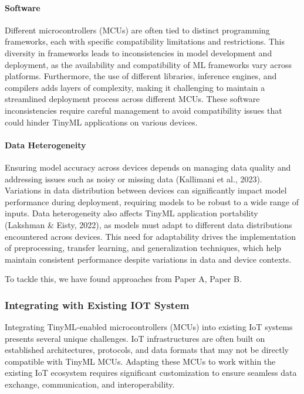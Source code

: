 \documentclass[twocolumn]{article}
\begin{document}
\paragraph{Software} Different microcontrollers (MCUs) are often tied to distinct programming frameworks, each with specific compatibility limitations and restrictions. This diversity in frameworks leads to inconsistencies in model development and deployment, as the availability and compatibility of ML frameworks vary across platforms. Furthermore, the use of different libraries, inference engines, and compilers adds layers of complexity, making it challenging to maintain a streamlined deployment process across different MCUs. These software inconsistencies require careful management to avoid compatibility issues that could hinder TinyML applications on various devices.

\paragraph{Data Heterogeneity} Ensuring model accuracy across devices depends on managing data quality and addressing issues such as noisy or missing data (Kallimani et al., 2023). Variations in data distribution between devices can significantly impact model performance during deployment, requiring models to be robust to a wide range of inputs. Data heterogeneity also affects TinyML application portability (Lakshman \& Eisty, 2022), as models must adapt to different data distributions encountered across devices. This need for adaptability drives the implementation of preprocessing, transfer learning, and generalization techniques, which help maintain consistent performance despite variations in data and device contexts.

To tackle this, we have found approaches from Paper A, Paper B.



\subsubsection{Integrating with Existing IOT System}
Integrating TinyML-enabled microcontrollers (MCUs) into existing IoT systems presents several unique challenges. IoT infrastructures are often built on established architectures, protocols, and data formats that may not be directly compatible with TinyML MCUs. Adapting these MCUs to work within the existing IoT ecosystem requires significant customization to ensure seamless data exchange, communication, and interoperability.
\end{document}
